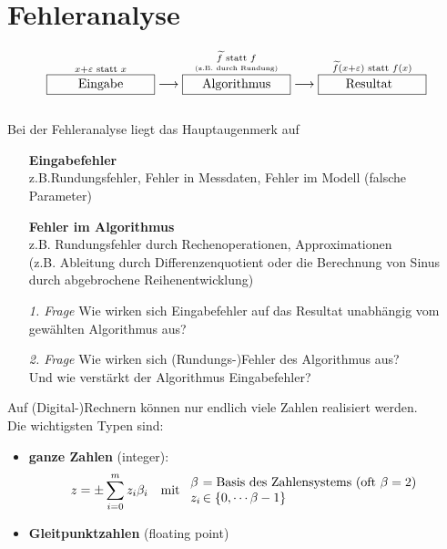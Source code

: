 %
%
%
%
\chapter{Fehleranalyse} \label{3}
\begin{align*}
  \overset{x+\varepsilon \text{ statt } x}{\framebox[3cm]{Eingabe}} \longrightarrow 
  \overset{\underset{\text{\tiny (z.B. durch Rundung)}}{\widetilde{f} \text{ statt } f}}{\framebox[3cm]{Algorithmus}} \longrightarrow
  \overset{\widetilde{f}(x+\varepsilon) \text{ statt } f(x)}{\framebox[3cm]{Resultat\phantom{g}}}
\end{align*}\\

Bei der Fehleranalyse liegt das Hauptaugenmerk auf
\begin{itemize}
\item[] \textbf{Eingabefehler}\\ z.B.Rundungsfehler, Fehler in Messdaten, Fehler im Modell (falsche Parameter)
\item[] \textbf{Fehler im Algorithmus} \\ z.B. Rundungsfehler durch Rechenoperationen, Approximationen \\
  (z.B. Ableitung durch Differenzenquotient oder die Berechnung von Sinus durch abgebrochene Reihenentwicklung)
  \\
\item[\textit{1. Frage}] Wie wirken sich Eingabefehler auf das Resultat unabhängig vom gewählten Algorithmus aus?
\item[\textit{2. Frage}]Wie wirken sich (Rundungs-)Fehler des Algorithmus aus?\\
  Und wie verstärkt der Algorithmus Eingabefehler?
\end{itemize}


 \label{3.1}  
Auf (Digital-)Rechnern können nur endlich viele Zahlen realisiert werden. \\
Die wichtigsten Typen sind: 
\begin{itemize}
\item \textbf{ganze Zahlen}  (integer):
  \begin{align*}
    z&=\pm \sum_{i=0}^{m}z_i\beta_i & \text{mit }
                                      \begin{array}{l@{\,}l}
                                        \beta &= \text{Basis des Zahlensystems (oft $\beta=2$)} \\
                                        z_i &\in \{0, \cdots \beta-1\}
                                      \end{array}
  \end{align*}
\item \textbf{Gleitpunktzahlen} (floating point) 
\end{itemize}

